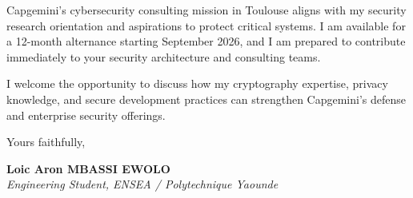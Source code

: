 \documentclass[a4paper,11pt]{article}
\begin{document}
Capgemini's cybersecurity consulting mission in Toulouse aligns with my security research orientation and aspirations to protect critical systems. I am available for a 12-month alternance starting September 2026, and I am prepared to contribute immediately to your security architecture and consulting teams.

I welcome the opportunity to discuss how my cryptography expertise, privacy knowledge, and secure development practices can strengthen Capgemini's defense and enterprise security offerings.

Yours faithfully,

\vspace{0.8cm}

\textbf{Loic Aron MBASSI EWOLO}\\
\textit{Engineering Student, ENSEA / Polytechnique Yaounde}
\end{document}
